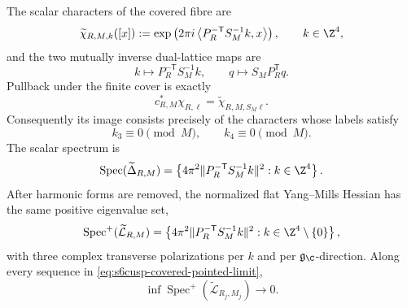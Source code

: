\begin{theorem}
\label{thm:s6cusp-covered-dual-modes}
The scalar characters of the covered fibre are
\begin{equation}\label{eq:s6cusp-covered-characters}
 \widetilde\chi_{R,M,k}([x])
 :=
 \exp\left(
 2\pi i\left\langle
 P_R^{-\mathsf T}S_M^{-1}k,x
 \right\rangle
 \right),
 \qquad k\in\Z^4,
\end{equation}
and the two mutually inverse dual-lattice maps are
\[
 k\longmapsto P_R^{-\mathsf T}S_M^{-1}k,
 \qquad
 q\longmapsto S_MP_R^{\mathsf T}q.
\]
Pullback under the finite cover is exactly
\begin{equation}\label{eq:s6cusp-covered-character-pullback}
 c_{R,M}^*\chi_{R,\ell}
 =\widetilde\chi_{R,M,S_M\ell}.
\end{equation}
Consequently its image consists precisely of the characters whose labels
satisfy
\begin{equation}\label{eq:s6cusp-old-mode-congruences}
 k_3\equiv0\pmod M,\qquad k_4\equiv0\pmod M.
\end{equation}
The scalar spectrum is
\begin{equation}\label{eq:s6cusp-covered-scalar-spectrum}
 \operatorname{Spec}(\widetilde\Delta_{R,M})
 =
 \left\{
 4\pi^2
 \lVert P_R^{-\mathsf T}S_M^{-1}k\rVert^2:
 k\in\Z^4
 \right\}.
\end{equation}
After harmonic forms are removed, the normalized flat Yang--Mills Hessian
has the same positive eigenvalue set,
\begin{equation}\label{eq:s6cusp-covered-gauge-spectrum}
 \operatorname{Spec}^+(\widetilde{\mathcal L}_{R,M})
 =
 \left\{
 4\pi^2
 \lVert P_R^{-\mathsf T}S_M^{-1}k\rVert^2:
 k\in\Z^4\setminus\{0\}
 \right\},
\end{equation}
with three complex transverse polarizations per \(k\) and per
\(\mathfrak g_{\C}\)-direction.  Along every sequence in
\eqref{eq:s6cusp-covered-pointed-limit},
\begin{equation}\label{eq:s6cusp-covered-hessian-gap-limit}
 \inf\operatorname{Spec}^+(\widetilde{\mathcal L}_{R_j,M_j})
 \longrightarrow0.
\end{equation}
\end{theorem}

